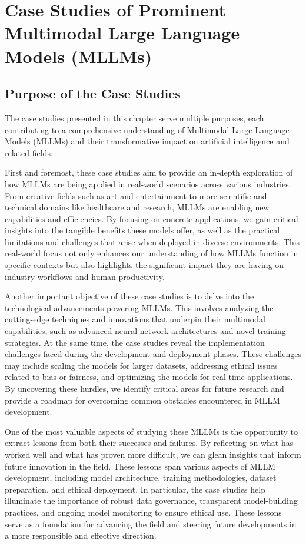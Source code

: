 \chapter{Case Studies of Prominent Multimodal Large Language Models (MLLMs)}

\section{Purpose of the Case Studies}
The case studies presented in this chapter serve multiple purposes, each contributing to a comprehensive understanding of Multimodal Large Language Models (MLLMs) and their transformative impact on artificial intelligence and related fields.

First and foremost, these case studies aim to provide an in-depth exploration of how MLLMs are being applied in real-world scenarios across various industries. From creative fields such as art and entertainment to more scientific and technical domains like healthcare and research, MLLMs are enabling new capabilities and efficiencies. By focusing on concrete applications, we gain critical insights into the tangible benefits these models offer, as well as the practical limitations and challenges that arise when deployed in diverse environments. This real-world focus not only enhances our understanding of how MLLMs function in specific contexts but also highlights the significant impact they are having on industry workflows and human productivity.

Another important objective of these case studies is to delve into the technological advancements powering MLLMs. This involves analyzing the cutting-edge techniques and innovations that underpin their multimodal capabilities, such as advanced neural network architectures and novel training strategies. At the same time, the case studies reveal the implementation challenges faced during the development and deployment phases. These challenges may include scaling the models for larger datasets, addressing ethical issues related to bias or fairness, and optimizing the models for real-time applications. By uncovering these hurdles, we identify critical areas for future research and provide a roadmap for overcoming common obstacles encountered in MLLM development.

One of the most valuable aspects of studying these MLLMs is the opportunity to extract lessons from both their successes and failures. By reflecting on what has worked well and what has proven more difficult, we can glean insights that inform future innovation in the field. These lessons span various aspects of MLLM development, including model architecture, training methodologies, dataset preparation, and ethical deployment. In particular, the case studies help illuminate the importance of robust data governance, transparent model-building practices, and ongoing model monitoring to ensure ethical use. These lessons serve as a foundation for advancing the field and steering future developments in a more responsible and effective direction.

